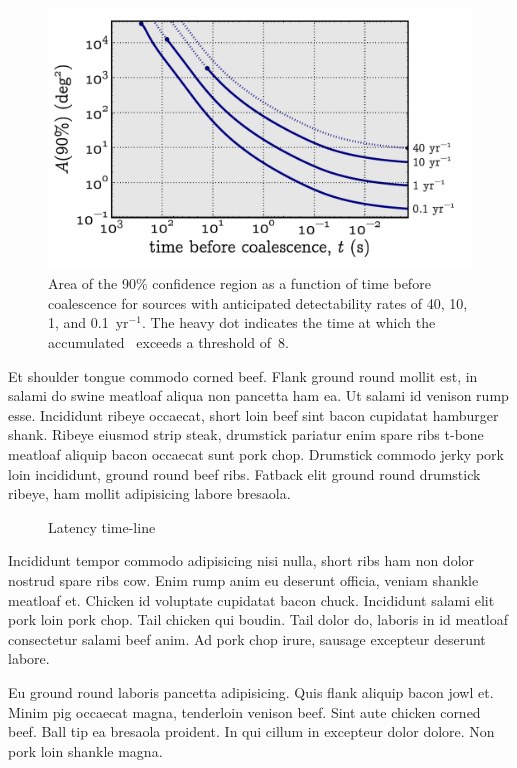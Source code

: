 \documentclass[portrait,plainboxedsections]{sciposter}
\begin{document}
\begin{minipage}[t]{0.25\textwidth}
\begin{figure}[h]
\includegraphics{figures/loc_in_time}
\caption{\label{fig:sky-localization-accuracy}Area of the 90\% confidence
region as a function of time before coalescence for sources with anticipated
detectability rates of 40, 10, 1, and 0.1~yr$^{-1}$. The heavy dot indicates
the time at which the accumulated \SNR\ exceeds a threshold of~8.}
\end{figure}

Et shoulder tongue commodo corned beef. Flank ground round mollit est, in
salami do swine meatloaf aliqua non pancetta ham ea. Ut salami id venison rump
esse. Incididunt ribeye occaecat, short loin beef sint bacon cupidatat
hamburger shank. Ribeye eiusmod strip steak, drumstick pariatur enim spare ribs
t-bone meatloaf aliquip bacon occaecat sunt pork chop. Drumstick commodo jerky
pork loin incididunt, ground round beef ribs. Fatback elit ground round
drumstick ribeye, ham mollit adipisicing labore bresaola.

\begin{figure}
\caption{Latency time-line}
\label{f:latency_timeline}
\end{figure}

Incididunt tempor commodo adipisicing nisi nulla, short ribs ham non dolor
nostrud spare ribs cow. Enim rump anim eu deserunt officia, veniam shankle
meatloaf et. Chicken id voluptate cupidatat bacon chuck. Incididunt salami elit
pork loin pork chop. Tail chicken qui boudin. Tail dolor do, laboris in id
meatloaf consectetur salami beef anim. Ad pork chop irure, sausage excepteur
deserunt labore.

Eu ground round laboris pancetta adipisicing. Quis flank aliquip bacon jowl et.
Minim pig occaecat magna, tenderloin venison beef. Sint aute chicken corned
beef. Ball tip ea bresaola proident. In qui cillum in excepteur dolor dolore.
Non pork loin shankle magna.

\end{minipage}%
\end{document}
